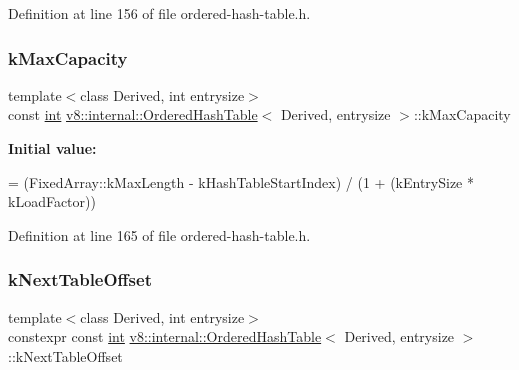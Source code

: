 Definition at line 156 of file ordered-\/hash-\/table.\+h.

\mbox{\label{classv8_1_1internal_1_1OrderedHashTable_accfec7a80633b1c439c3d26c29681d2c}} 
\subsubsection{\texorpdfstring{k\+Max\+Capacity}{kMaxCapacity}}
{\footnotesize\ttfamily template$<$class Derived, int entrysize$>$ \\
const \mbox{\hyperlink{classint}{int}} \mbox{\hyperlink{classv8_1_1internal_1_1OrderedHashTable}{v8\+::internal\+::\+Ordered\+Hash\+Table}}$<$ Derived, entrysize $>$\+::k\+Max\+Capacity\hspace{0.3cm}{\ttfamily [static]}}

{\bfseries Initial value\+:}
\begin{DoxyCode}
=
      (FixedArray::kMaxLength - kHashTableStartIndex) /
      (1 + (kEntrySize * kLoadFactor))
\end{DoxyCode}


Definition at line 165 of file ordered-\/hash-\/table.\+h.

\mbox{\label{classv8_1_1internal_1_1OrderedHashTable_a3928567013bfd0e6679b818f4f3372cf}} 
\subsubsection{\texorpdfstring{k\+Next\+Table\+Offset}{kNextTableOffset}}
{\footnotesize\ttfamily template$<$class Derived, int entrysize$>$ \\
constexpr const \mbox{\hyperlink{classint}{int}} \mbox{\hyperlink{classv8_1_1internal_1_1OrderedHashTable}{v8\+::internal\+::\+Ordered\+Hash\+Table}}$<$ Derived, entrysize $>$\+::k\+Next\+Table\+Offset\hspace{0.3cm}{\ttfamily [static]}}

